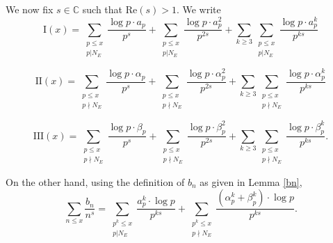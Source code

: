 \documentclass[12pt,reqno]{amsart}
\theoremstyle{definition}
\numberwithin{equation}{section}
\begin{document}
We now fix $s \in \mathbb C$ such that $\textrm{Re}(s)>1$. We write 
\begin{equation*}
 \text{I}(x) = \sum_{\substack{p \leq x \\ p | N_E}}  \frac{\log p  \cdot a_p}{p^s}+\sum_{\substack{p \leq x \\ p | N_E}}  \frac{\log p \cdot a_p^2}{p^{2s}}+ \sum_{k \geq 3} \sum_{\substack{p \leq x \\ p | N_E}} \frac{\log p  \cdot a_p^{k} }{p^{ks}}
\end{equation*}

\begin{equation*}
    \text{II}(x) =  \sum_{\substack{p \leq x \\ p \nmid N_E}}  \frac{\log p  \cdot \alpha_p}{p^s}+\sum_{\substack{p \leq x \\ p \nmid N_E}}  \frac{\log p \cdot \alpha_p^2}{p^{2s}}+ \sum_{k \geq 3} \sum_{\substack{p \leq x \\ p \nmid  N_E}} \frac{\log p  \cdot \alpha_p^{k} }{p^{ks}}
\end{equation*}




\begin{equation*} 
\text{III}(x) = \sum_{\substack{p \leq x \\ p \nmid N_E}}  \frac{\log p  \cdot \beta_p}{p^s}+\sum_{\substack{p \leq x \\ p \nmid N_E}} \frac{\log p \cdot \beta_p^2}{p^{2s}}+ \sum_{k \geq 3} \sum_{\substack{p \leq x \\ p \nmid N_E}} \frac{\log p  \cdot \beta_p^{k} }{p^{ks}}. 
\end{equation*}

On the other hand, using the definition of $b_n$ as given in Lemma \ref{bn}, 
\begin{equation*}
\sum_{n \leq x} \frac{b_n}{n^s}= {\sum_{\substack{p^k \leq x \\ p | N_E}}} \frac{a_p^k \cdot \log p}{p^{ks}} +  {\sum_{\substack{p^k \leq x \\ p \nmid  N_E}}} \frac{ (\alpha_p^k+\beta_p^k) \cdot \log p}{p^{ks}}. 
\end{equation*}
\end{document}
